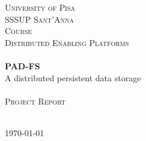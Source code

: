 \begin{titlepage}
  \begin{center}

    \textsc{\LARGE University of Pisa}\\[0.5cm]
    \textsc{\LARGE SSSUP Sant'Anna}\\[2cm]

    \textsc{Course}\\[0.5cm]
    \textsc{\Large Distributed Enabling Platforms}\\[2.5cm]

    \HRule\\[0.4cm]
    {\huge \bfseries PAD-FS}\\[0.5cm]
    {\huge A distributed persistent data storage}\\[0.4cm]
    \HRule\\[3cm]
    \textsc{Project Report}\\[0.4cm]

    \noindent{}\\[1cm]


    \vfill

    {\large \today}

  \end{center}
\end{titlepage}
